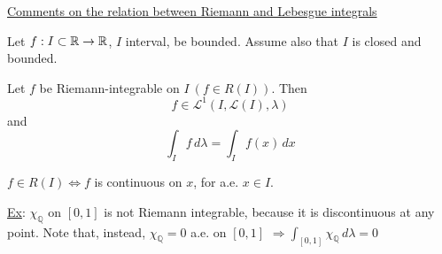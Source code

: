 \underline{Comments on the relation between Riemann and Lebesgue integrals}

Let \(f : I \subset \mathbb{R} \to \mathbb{R}\), \(I\) interval, be bounded. Assume also that \(I\) is closed and bounded.
\begin{theorem}
    Let \(f\) be Riemann-integrable on \(I \ (f \in R(I))\). Then 
    \[
        f\in \mathcal{L}^1(I, \mathcal{L}(I), \lambda)
    \]
    and 
    \[
        \int_I f \, d\lambda = \int_I f(x) \, dx
    \]
\end{theorem}
\begin{theorem}
    \(f \in R(I) \Longleftrightarrow f\) is continuous on \(x\), for a.e. \(x \in I\).
\end{theorem}
\underline{Ex}: \(\chi_{\mathbb{Q}}\) on \([0,1]\) is not Riemann integrable, because it is discontinuous at any point. Note that, instead, \(\chi_{\mathbb{Q}} = 0\) a.e. on \([0,1]\) \(\Longrightarrow \int_{[0,1]} \chi_{\mathbb{Q}} \, d\lambda = 0\)
